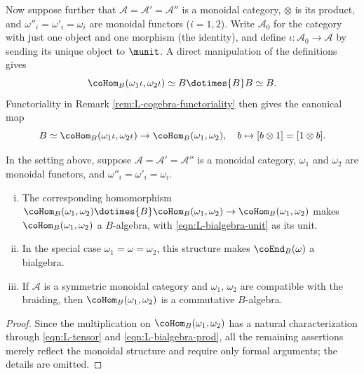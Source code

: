 Now suppose further that $\mathcal{A} = \mathcal{A}' = \mathcal{A}''$ is a monoidal category, $\otimes$ is its product, and $\omega''_i = \omega'_i = \omega_i$ are monoidal functors ($i=1,2$). Write $\mathcal{A}_0$ for the category with just one object and one morphism (the identity), and define $\iota: \mathcal{A}_0 \to \mathcal{A}$ by sending its unique object to $\munit$. A direct manipulation of the definitions gives
\[ \coHom_B(\omega_1 \iota, \omega_2 \iota) \simeq B \dotimes{B} B \simeq B. \]
Functoriality in Remark \ref{rem:L-cogebra-functoriality} then gives the canonical map
\begin{equation}\label{eqn:L-bialgebra-unit}
	B \simeq \coHom_B(\omega_1 \iota, \omega_2 \iota) \to \coHom_B(\omega_1, \omega_2), \quad b \mapsto [b \otimes 1] = [1 \otimes b].
\end{equation}

\begin{proposition}\label{prop:L-bialgebra}
	In the setting above, suppose $\mathcal{A} = \mathcal{A}' = \mathcal{A}''$ is a monoidal category, $\omega_1$ and $\omega_2$ are monoidal functors, and $\omega''_i = \omega'_i = \omega_i$.
	\begin{enumerate}[(i)]
		\item The corresponding homomorphism $\coHom_B(\omega_1, \omega_2) \dotimes{B} \coHom_B(\omega_1, \omega_2) \to \coHom_B(\omega_1, \omega_2)$ makes $\coHom_B(\omega_1, \omega_2)$ a $B$-algebra, with \eqref{eqn:L-bialgebra-unit} as its unit.
		\item In the special case $\omega_1 = \omega = \omega_2$, this structure makes $\coEnd_B(\omega)$ a bialgebra.
		\item If $\mathcal{A}$ is a symmetric monoidal category and $\omega_1$, $\omega_2$ are compatible with the braiding, then $\coHom_B(\omega_1, \omega_2)$ is a commutative $B$-algebra.
	\end{enumerate}
\end{proposition}
\begin{proof}
	Since the multiplication on $\coHom_B(\omega_1, \omega_2)$ has a natural characterization through \eqref{eqn:L-tensor} and \eqref{eqn:L-bialgebra-prod}, all the remaining assertions merely reflect the monoidal structure and require only formal arguments; the details are omitted.
\end{proof}
